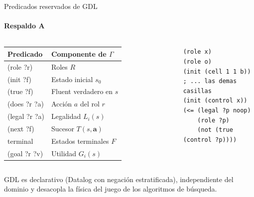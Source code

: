 \documentclass[aspectratio=169,10pt,t]{beamer}
\begin{document}
\begin{frame}[fragile]{Predicados reservados de GDL}
\framesubtitle{Respaldo A}
\begin{columns}[T]
\scriptsize
\renewcommand{\arraystretch}{1.18}
\begin{tabularx}{\linewidth}{@{}>{\ttfamily}p{2.45cm}X@{}}
\toprule
\textrm{Predicado} & Componente de $\Gamma$ \\
\midrule
(role ?r) & Roles $R$ \\
(init ?f) & Estado inicial $s_0$ \\
(true ?f) & Fluent verdadero en $s$ \\
(does ?r ?a) & Acción $a$ del rol $r$ \\
(legal ?r ?a) & Legalidad $L_i(s)$ \\
(next ?f) & Sucesor $T(s,\mathbf{a})$ \\
terminal & Estados terminales $F$ \\
(goal ?r ?v) & Utilidad $G_i(s)$ \\
\bottomrule
\end{tabularx}
\begin{lstlisting}
(role x)
(role o)
(init (cell 1 1 b))
; ... las demas casillas
(init (control x))
(<= (legal ?p noop)
    (role ?p)
    (not (true (control ?p))))
\end{lstlisting}
\end{columns}
\vspace{3pt}
{\footnotesize GDL es declarativo (Datalog con negación estratificada), independiente del dominio y desacopla la física del juego de los algoritmos de búsqueda.\par}
\end{frame}
\end{document}
